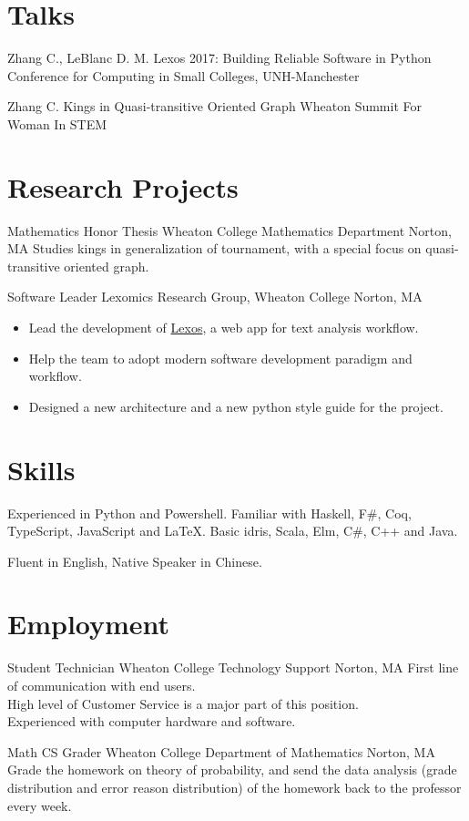 \documentclass[11pt,a4paper,roman]{moderncv}        %
\begin{document}
\section{Talks}

{Zhang C., LeBlanc D. M.}
{Lexos 2017: Building Reliable Software in Python}
{Conference for Computing in Small Colleges, UNH-Manchester}
{}{}

{Zhang C.}
{Kings in Quasi-transitive Oriented Graph}
{Wheaton Summit For Woman In STEM}
{}{}



\section{Research Projects}

{Mathematics Honor Thesis}
{Wheaton College Mathematics Department}
{Norton, MA}{}
{Studies kings in generalization of tournament,
with a special focus on quasi-transitive oriented graph.}

{Software Leader}
{Lexomics Research Group, Wheaton College}
{Norton, MA}{}
{
  \begin{itemize}
    \item
      Lead the development of \href{https://github.com/WheatonCS/Lexos}{Lexos}, a web app for text analysis workflow.
    \item
      Help the team to adopt modern software development paradigm and workflow.
    \item
      Designed a new architecture and a new python style guide for the project.
  \end{itemize}
}



\section{Skills}

{Experienced in Python and Powershell.
Familiar with Haskell, F\#, Coq, TypeScript, JavaScript and \LaTeX{}.
Basic idris, Scala, Elm, C\#, C++ and Java.}

{Fluent in English, Native Speaker in Chinese.}



\section{Employment}
{Student Technician}
{Wheaton College Technology Support}
{Norton, MA}{}
{First line of communication with end users.\\
High level of Customer Service is a major part of this position.\\
Experienced with computer hardware and software.}

{Math CS Grader}
{Wheaton College Department of Mathematics}
{Norton, MA}{}
{Grade the homework on theory of probability,
and send the data analysis (grade distribution and error reason distribution)
of the homework back to the professor every week.}
\end{document}
